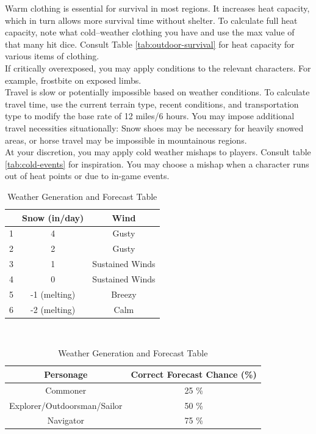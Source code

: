 \documentclass[notitlepage]{article}
\begin{document}
\begin{multicols}{2}
Warm clothing is essential for survival in most regions.
It increases heat capacity, which in turn allows more survival time without shelter.
To calculate full heat capacity, note what cold--weather clothing you have and use the max value of that many hit dice.
Consult Table \ref{tab:outdoor-survival} for heat capacity for various items of clothing. \\

If critically overexposed, you may apply conditions to the relevant characters.
For example, frostbite on exposed limbs. \\

Travel is slow or potentially impossible based on weather conditions.
To calculate travel time, use the current terrain type, recent conditions, and transportation type to modify the base rate of 12 miles/6 hours.
You may impose additional travel necessities situationally: Snow shoes may be necessary for heavily snowed areas, or horse travel may be impossible in mountainous regions. \\

At your discretion, you may apply cold weather mishaps to players.
Consult table \ref{tab:cold-events} for inspiration.
You may choose a mishap when a character runs out of heat points or due to in-game events.

\begin{table}[t]
  \centering \large
  \begin{tabular}{| c || c || c ||}
    \hline
    & Snow (in/day) & Wind \\ \hline
    1 & 4 & Gusty \\
    2 & 2 & Gusty \\
    3 & 1 & Sustained Winds \\
    4 & 0 & Sustained Winds \\
    5 & -1 (melting) & Breezy \\
    6 & -2 (melting)  & Calm \\ \hline
  \end{tabular} \\

  \begin{tabular}{|c||c|}
    \hline Personage & Correct Forecast Chance (\%) \\ \hline
    Commoner  & 25 \% \\
    Explorer/Outdoorsman/Sailor & 50 \% \\
    Navigator & 75 \% \\ \hline
  \end{tabular}
  \caption{Weather Generation and Forecast Table}
  \label{tbl:weather}  
\end{table}  



\end{multicols}
\end{document}
